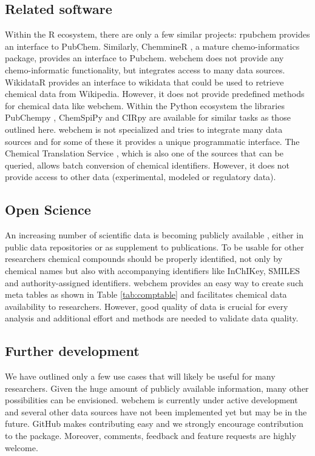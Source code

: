 \subsection[Related software]{Related software}
Within the R ecosystem, there are only a few similar projects:
rpubchem \citep{rpubchem_2014} provides an interface to PubChem.
Similarly, ChemmineR \citep{chemminer_2008}, a mature chemo-informatics package, provides an interface to Pubchem. 
webchem does not provide any chemo-informatic functionality, but integrates access to many data sources.
WikidataR \citep{wikidatar_2016} provides an interface to wikidata that could be used to retrieve chemical data from Wikipedia.
However, it does not provide predefined methods for chemical data like webchem.
Within the Python ecosystem the libraries PubChempy \citep{pubchempy}, ChemSpiPy \citep{chemspipy} and CIRpy \citep{cirpy} are available for similar tasks as those outlined here.
webchem is not specialized and tries to integrate many data sources and for some of these it provides a unique programmatic interface.
The Chemical Translation Service \citep{wohlgemuth_haldiya_willighagen_kind_fiehn_2010}, which is also one of the sources that can be queried, allows batch conversion of chemical identifiers.
However, it does not provide access to other data (experimental, modeled or regulatory data).


\subsection[Open Science]{Open Science}
An increasing number of scientific data is becoming publicly available \citep{Gewin_2016, Reichman_Jones_Schildhauer_2011,Boyle_Guha_2011}, either in public data repositories or as supplement to publications.
To be usable for other researchers chemical compounds should be properly identified, not only by chemical names but also with accompanying identifiers like InChIKey, SMILES and authority-assigned identifiers.
webchem provides an easy way to create such meta tables as shown in Table \ref{tab:comptable} and facilitates chemical data availability to researchers.
However, good quality of data is crucial for every analysis \citep{stieger2014} and additional effort and methods are needed to validate data quality.

\subsection[Further development]{Further development}
We have outlined only a few use cases that will likely be useful for many researchers.
Given the huge amount of publicly available information, many other possibilities can be envisioned.
webchem is currently under active development and several other data sources have not been implemented yet but may be in the future.
GitHub makes contributing easy and we strongly encourage contribution to the package.
Moreover, comments, feedback and feature requests are highly welcome.


